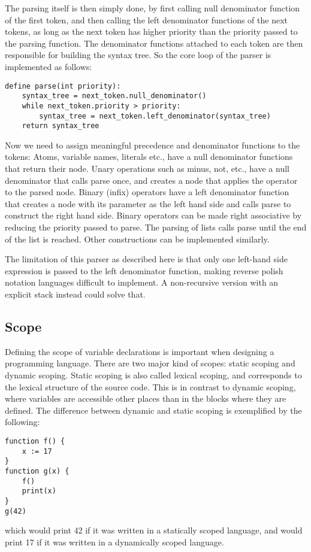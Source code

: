 \documentclass[11pt]{report}
\begin{document}
The parsing itself is then simply done, by first calling null denominator function of the first token, and then calling the left denominator functions of the next tokens, as long as the next token has higher priority than the priority passed to the parsing function.
The denominator functions attached to each token are then responsible for building the syntax tree.
So the core loop of the parser is implemented as follows:
\begin{verbatim}
define parse(int priority):
    syntax_tree = next_token.null_denominator()
    while next_token.priority > priority:
        syntax_tree = next_token.left_denominator(syntax_tree)
    return syntax_tree
\end{verbatim}

Now we need to assign meaningful precedence and denominator functions to the tokens:
Atoms, variable names, literals etc., have a null denominator functions that return their node. Unary operations such as minus, not, etc., have a null denominator that calls parse once, and creates a node that applies the operator to the parsed node.
Binary (infix) operators have a left denominator function that creates a node with its parameter as the left hand side and calls parse to construct the right hand side. Binary operators can be made right associative by reducing the priority passed to parse.
The parsing of lists calls parse until the end of the list is reached. Other constructions can be implemented similarly. 

The limitation of this parser as described here is that only one left-hand side expression is passed to the left denominator function, making reverse polish notation languages difficult to implement. A non-recursive version with an explicit stack instead could solve that.

\subsection{Scope}
\label{survey-scope}
Defining the scope of variable declarations  is important when designing a programming language.
There are two major kind of scopes: static scoping and dynamic scoping.
Static scoping is also called lexical scoping, and corresponds to the lexical structure of the source code.
This is in contrast to dynamic scoping, where variables are accessible other places than in the blocks where they are defined. 
The difference between dynamic and static scoping is exemplified by the following:
\begin{verbatim}
function f() {
    x := 17
}
function g(x) {
    f()
    print(x)
}
g(42)
\end{verbatim}
which would print 42 if it was written in a statically scoped language, and would print 17 if it was written in a dynamically scoped language.
\end{document}
